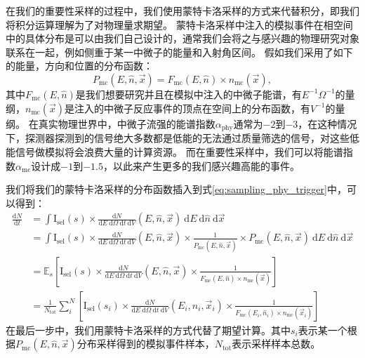 在我们的重要性采样的过程中，我们使用蒙特卡洛采样的方式来代替积分，即我们将积分运算理解为了对物理量求期望。
蒙特卡洛采样中注入的模拟事件在相空间中的具体分布是可以由我们自己设计的，通常我们会将之与感兴趣的物理研究对象联系在一起，例如侧重于某一中微子的能量和入射角区间。
假如我们采用了如下的能量，方向和位置的分布函数：
\begin{equation}
    P_\mathrm{mc} (E, \hat{n}, \vec{x}) = F_\mathrm{mc} (E, \hat{n}) \times n_\mathrm{mc}(\vec{x}) ,
    \label{eq:sampling_MC_pdf}
\end{equation}
其中$F_\mathrm{mc} (E, \hat{n})$是我们想要研究并且在模拟中注入的中微子能谱，有$E^{-1} \Omega^{-1}$的量纲，$n_\mathrm{mc}(\vec{x})$是注入的中微子反应事件的顶点在空间上的分布函数，有$V^{-1}$的量纲。
在真实物理世界中，中微子流强的能谱指数$\alpha_\mathrm{phy}$通常为$-2$到$-3$，在这种情况下，探测器探测到的信号绝大多数都是低能的无法通过质量筛选的信号，对这些低能信号做模拟将会浪费大量的计算资源。
而在重要性采样中，我们可以将能谱指数$\alpha_\mathrm{mc}$设计成$-1$到$-1.5$，以此来产生更多的我们感兴趣高能的事件。

我们将我们的蒙特卡洛采样的分布函数插入到式\ref{eq:sampling_phy_trigger}中，可以得到：
\begin{equation}
\begin{aligned}
    \frac{\mathrm{d}N}{\mathrm{d}t} &= 
    \int \mathrm{I}_\mathrm{sel}(s) \times 
    \frac{\mathrm{d}N}{\mathrm{d}E ~\mathrm{d}\Omega ~\mathrm{d}t ~\mathrm{d}V}(E, \hat{n}, \vec{x}) 
    ~\mathrm{d}E ~\mathrm{d}\hat{n} ~\mathrm{d}\vec{x} \\
    &= \int \mathrm{I}_\mathrm{sel}(s) \times 
    \frac{\mathrm{d}N}{\mathrm{d}E ~\mathrm{d}\Omega ~\mathrm{d}t ~\mathrm{d}V} (E, \hat{n}, \vec{x})
    \times \frac{1}{P_\mathrm{mc} (E, \hat{n}, \vec{x})} \times P_\mathrm{mc} (E, \hat{n}, \vec{x})
    ~\mathrm{d}E ~\mathrm{d}\hat{n} ~\mathrm{d}\vec{x} \\
    &= \mathbb{E}_s \left[ \mathrm{I}_\mathrm{sel}(s) \times 
    \frac{\mathrm{d}N}{\mathrm{d}E ~\mathrm{d}\Omega ~\mathrm{d}t ~\mathrm{d}V} (E, \hat{n}, \vec{x})
    \times \frac{1}{F_\mathrm{mc} (E, \hat{n}) \times n_\mathrm{mc}(\vec{x})}   \right]  \\
    &= \frac{1}{N_\mathrm{tot}} \sum^N_i \left[ 
    \mathrm{I}_\mathrm{sel}(s_i) \times 
    \frac{\mathrm{d}N}{\mathrm{d}E ~\mathrm{d}\Omega ~\mathrm{d}t ~\mathrm{d}V} (E_i, \hat{n}_i, \vec{x}_i)
    \times \frac{1}{F_\mathrm{mc} (E_i, \hat{n}_i) \times n_\mathrm{mc}(\vec{x}_i)} \right]
\end{aligned}
\label{eq:sampling_MC_trigger}
\end{equation}
在最后一步中，我们用蒙特卡洛采样的方式代替了期望计算。其中$s_i$表示某一个根据$P_\mathrm{mc} (E, \hat{n}, \vec{x})$分布采样得到的模拟事件样本，$N_\mathrm{tot}$表示采样样本总数。


